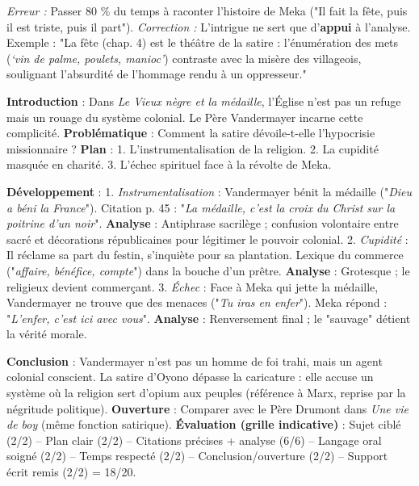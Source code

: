 \documentclass[11pt]{article}
\begin{document}
\begin{attention}
\emph{Erreur :} Passer 80 \% du temps à raconter l'histoire de Meka ("Il fait la fête, puis il est triste, puis il part").
\emph{Correction :} L'intrigue ne sert que d'\textbf{appui} à l'analyse. Exemple : "La fête (chap. 4) est le théâtre de la satire : l'énumération des mets (\emph{‘vin de palme, poulets, manioc’}) contraste avec la misère des villageois, soulignant l'absurdité de l'hommage rendu à un oppresseur."
\end{attention}

\begin{exoresolu}
\textbf{Introduction} : Dans \emph{Le Vieux nègre et la médaille}, l'Église n'est pas un refuge mais un rouage du système colonial. Le Père Vandermayer incarne cette complicité. \textbf{Problématique} : Comment la satire dévoile-t-elle l'hypocrisie missionnaire ? \textbf{Plan} : 1. L'instrumentalisation de la religion. 2. La cupidité masquée en charité. 3. L'échec spirituel face à la révolte de Meka.

\textbf{Développement} :
1. \emph{Instrumentalisation} : Vandermayer bénit la médaille ("\emph{Dieu a béni la France}"). Citation p. 45 : "\emph{La médaille, c'est la croix du Christ sur la poitrine d'un noir}". \textbf{Analyse} : Antiphrase sacrilège ; confusion volontaire entre sacré et décorations républicaines pour légitimer le pouvoir colonial.
2. \emph{Cupidité} : Il réclame sa part du festin, s'inquiète pour sa plantation. Lexique du commerce ("\emph{affaire, bénéfice, compte}") dans la bouche d'un prêtre. \textbf{Analyse} : Grotesque ; le religieux devient commerçant.
3. \emph{Échec} : Face à Meka qui jette la médaille, Vandermayer ne trouve que des menaces ("\emph{Tu iras en enfer}"). Meka répond : "\emph{L'enfer, c'est ici avec vous}". \textbf{Analyse} : Renversement final ; le "sauvage" détient la vérité morale.

\textbf{Conclusion} : Vandermayer n'est pas un homme de foi trahi, mais un agent colonial conscient. La satire d'Oyono dépasse la caricature : elle accuse un système où la religion sert d'opium aux peuples (référence à Marx, reprise par la négritude politique). \textbf{Ouverture} : Comparer avec le Père Drumont dans \emph{Une vie de boy} (même fonction satirique).
\tcblower
\textbf{Évaluation (grille indicative)} : Sujet ciblé (2/2) -- Plan clair (2/2) -- Citations précises + analyse (6/6) -- Langage oral soigné (2/2) -- Temps respecté (2/2) -- Conclusion/ouverture (2/2) -- Support écrit remis (2/2) = 18/20.
\end{exoresolu}
\end{document}
